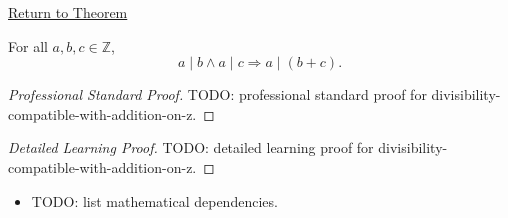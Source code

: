 \newpage
{}
\label{prf:divisibility-compatible-with-addition-on-z}

\begin{remark*}[Return]
\hyperref[prop:divisibility-compatible-with-addition-on-z]{Return to Theorem}
\end{remark*}

\begin{proposition*}
For all $a,b,c\in\mathbb{Z}$,
\[
a\mid b\land a\mid c \Longrightarrow a\mid(b+c).
\]
\end{proposition*}

\begin{proof}[Professional Standard Proof]
\LRAProofBodyStart
TODO: professional standard proof for divisibility-compatible-with-addition-on-z.
\end{proof}

\begin{proof}[Detailed Learning Proof]
\LRAProofBodyStart
TODO: detailed learning proof for divisibility-compatible-with-addition-on-z.
\end{proof}

\begin{remark*}
\end{remark*}

\begin{dependencies}
\begin{itemize}
  \item TODO: list mathematical dependencies.
\end{itemize}
\end{dependencies}

\clearpage
